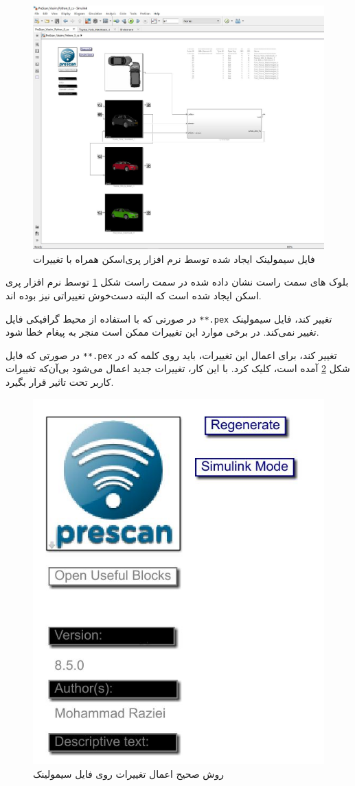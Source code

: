 \begin{figure}
	\centering
	\includegraphics[width=0.7\linewidth]{Figures/simulink/first_view}
	\caption{فایل سیمولینک ایجاد شده توسط نرم افزار پری‌اسکن همراه با تغییرات}
	\label{fig:simulink-firstview}
\end{figure}




بلوک های سمت راست نشان داده شده در سمت راست شکل
\ref{fig:simulink-firstview}
توسط نرم افزار پری اسکن ایجاد شده است که البته دست‌خوش تغییراتی نیز بوده اند. 

در صورتی که با استفاده از محیط گرافیکی  فایل \texttt{**.pex} تغییر کند، فایل سیمولینک تغییر نمی‌کند. در برخی موارد این تغییرات ممکن است منجر به پیغام خطا شود.

\begin{remark}\label{remark:Regenerate}
	در صورتی که فایل
	 \texttt{**.pex}
	 تغییر کند، برای اعمال این تغییرات، باید روی کلمه 
	 که در شکل 
	 \ref{fig:simulink-generate}
	 آمده است، کلیک کرد. با این کار، تغییرات جدید اعمال می‌شود بی‌آن‌که تغییرات کاربر تحت تاثیر قرار بگیرد.
\end{remark}

\begin{figure}
	\centering
	\includegraphics[width=0.4\linewidth]{Figures/simulink/generate}
	\caption{روش صحیح اعمال تغییرات روی فایل سیمولینک}
	\label{fig:simulink-generate}
\end{figure}

